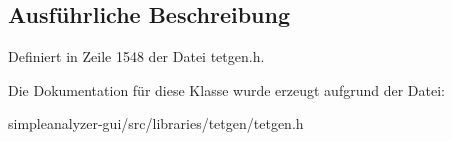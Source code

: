 \subsection{Ausführliche Beschreibung}


Definiert in Zeile 1548 der Datei tetgen.\-h.



Die Dokumentation für diese Klasse wurde erzeugt aufgrund der Datei\-:\begin{DoxyCompactItemize}
\item 
simpleanalyzer-\/gui/src/libraries/tetgen/tetgen.\-h\end{DoxyCompactItemize}
